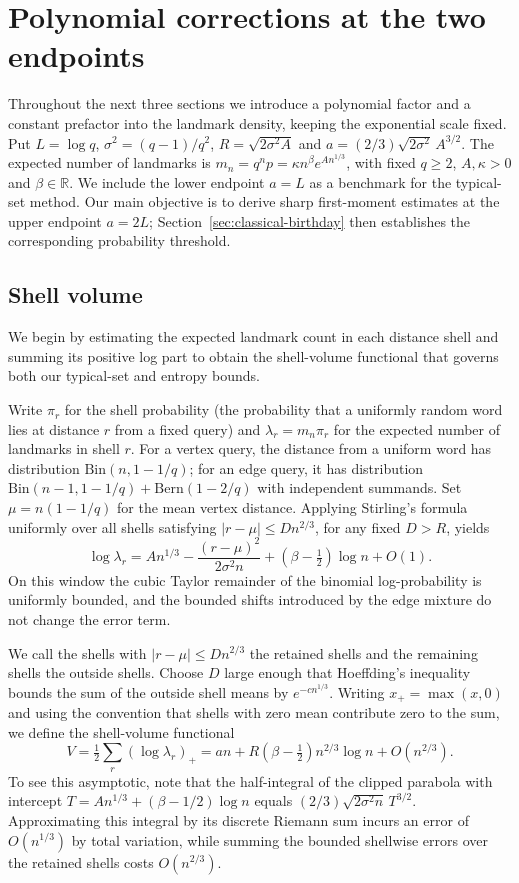 \section{Polynomial corrections at the two endpoints}
Throughout the next three sections we introduce a polynomial factor and a constant prefactor into the landmark density, keeping the exponential scale fixed. Put $L=\log q$, $\sigma^2=(q-1)/q^2$, $R=\sqrt{2\sigma^2 A}$ and $a=(2/3)\sqrt{2\sigma^2}\,A^{3/2}$. The expected number of landmarks is $m_n=q^np=\kappa n^\beta e^{An^{1/3}}$, with fixed $q\ge2$, $A,\kappa>0$ and $\beta\in\mathbb R$. We include the lower endpoint $a=L$ as a benchmark for the typical-set method. Our main objective is to derive sharp first-moment estimates at the upper endpoint $a=2L$; Section~\ref{sec:classical-birthday} then establishes the corresponding probability threshold.

\subsection{Shell volume}
We begin by estimating the expected landmark count in each distance shell and summing its positive log part to obtain the shell-volume functional that governs both our typical-set and entropy bounds.

Write $\pi_r$ for the shell probability (the probability that a uniformly random word lies at distance $r$ from a fixed query) and $\lambda_r=m_n\pi_r$ for the expected number of landmarks in shell $r$. For a vertex query, the distance from a uniform word has distribution $\mathrm{Bin}(n,1-1/q)$; for an edge query, it has distribution $\mathrm{Bin}(n-1,1-1/q)+\mathrm{Bern}(1-2/q)$ with independent summands. Set $\mu=n(1-1/q)$ for the mean vertex distance. Applying Stirling's formula uniformly over all shells satisfying $|r-\mu|\le Dn^{2/3}$, for any fixed $D>R$, yields
\[
 \log\lambda_r=An^{1/3}-\frac{(r-\mu)^2}{2\sigma^2 n}
 +(\beta-\tfrac12)\log n+O(1).
\]
On this window the cubic Taylor remainder of the binomial log-probability is uniformly bounded, and the bounded shifts introduced by the edge mixture do not change the error term.

We call the shells with $|r-\mu|\le Dn^{2/3}$ the retained shells and the remaining shells the outside shells. Choose $D$ large enough that Hoeffding's inequality bounds the sum of the outside shell means by $e^{-c n^{1/3}}$. Writing $x_+=\max(x,0)$ and using the convention that shells with zero mean contribute zero to the sum, we define the shell-volume functional
\[
 V=\tfrac12\sum_r(\log\lambda_r)_+
 =an+R(\beta-\tfrac12)n^{2/3}\log n+O(n^{2/3}).
\]
To see this asymptotic, note that the half-integral of the clipped parabola with intercept $T=An^{1/3}+(\beta-1/2)\log n$ equals $(2/3)\sqrt{2\sigma^2 n}\,T^{3/2}$. Approximating this integral by its discrete Riemann sum incurs an error of $O(n^{1/3})$ by total variation, while summing the bounded shellwise errors over the retained shells costs $O(n^{2/3})$.

